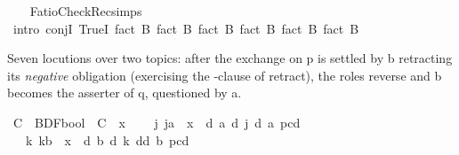 \begin{isabellebody}
%
\isadelimproof
\ \ %
\endisadelimproof
%
\isatagproof
{}\isamarkupfalse%
\ FatioCheckRec{\isachardot}{\kern0pt}simps\isanewline
\ \ \isamarkupfalse%
\ {\isacharparenleft}{\kern0pt}intro\ conjI\ TrueI{\isacharparenright}{\kern0pt}\ {\isacharparenleft}{\kern0pt}fact\ B{}{\isacharcomma}{\kern0pt}\ fact\ B{}{\isacharcomma}{\kern0pt}\ fact\ B{}{\isacharcomma}{\kern0pt}\ fact\ B{}{\isacharcomma}{\kern0pt}\ fact\ B{}{\isacharcomma}{\kern0pt}\ fact\ B{}{\isacharparenright}{\kern0pt}%
\endisatagproof
{\isafoldproof}%
%
\isadelimproof
%
\endisadelimproof
%
\isadelimdocument
%
\endisadelimdocument
%
\isatagdocument
%
\isamarkuptrue%
%
\endisatagdocument
{\isafolddocument}%
%
\isadelimdocument
%
\endisadelimdocument
%
\begin{isamarkuptext}%
Seven locutions over two topics: after the exchange on p is settled by b
retracting its \emph{negative} obligation (exercising the \isa{{\isasymominus}}-clause of retract), the
roles reverse and b becomes the asserter of q, questioned by a.%
\end{isamarkuptext}\isamarkuptrue%
\isamarkupfalse%
\ {\isasymGamma}\isactrlsub C\ {\isacharcolon}{\kern0pt}{\isacharcolon}{\kern0pt}\ {\isachardoublequoteopen}BDF{\isasymRightarrow}bool{\isachardoublequoteclose}\ \ {\isachardoublequoteopen}{\isasymGamma}\isactrlsub C\ {\isasymequiv}\ {\isasymlambda}x{\isachardot}{\kern0pt}\isanewline
\ \ \ \ {\isacharparenleft}{\kern0pt}{\isasymexists}j{\isachardot}{\kern0pt}\ j{\isasymnoteq}a\ {\isasymand}\ x\ {\isacharequal}{\kern0pt}\ {\isasymD}\isactrlsup d\ a\ {\isacharparenleft}{\kern0pt}{\isasymB}\isactrlsup d\ j\ {\isacharparenleft}{\kern0pt}{\isasymB}\isactrlsup d\ a\ {\isacharbraceleft}{\kern0pt}p\isactrlsup c{\isacharbraceright}{\kern0pt}\isactrlsup d{\isacharparenright}{\kern0pt}{\isacharparenright}{\kern0pt}{\isacharparenright}{\kern0pt}\isanewline
\ \ {\isasymor}\ {\isacharparenleft}{\kern0pt}{\isasymexists}k{\isachardot}{\kern0pt}\ k{\isasymnoteq}b\ {\isasymand}\ x\ {\isacharequal}{\kern0pt}\ {\isasymD}\isactrlsup d\ b\ {\isacharparenleft}{\kern0pt}{\isasymB}\isactrlsup d\ k\ {\isacharparenleft}{\kern0pt}{\isasymnot}\isactrlsup d{\isacharparenleft}{\kern0pt}{\isasymB}\isactrlsup d\ b\ {\isacharbraceleft}{\kern0pt}p\isactrlsup c{\isacharbraceright}{\kern0pt}\isactrlsup d{\isacharparenright}{\kern0pt}{\isacharparenright}{\kern0pt}{\isacharparenright}{\kern0pt}{\isacharparenright}{\kern0pt}\isanewline

\end{isabellebody}
